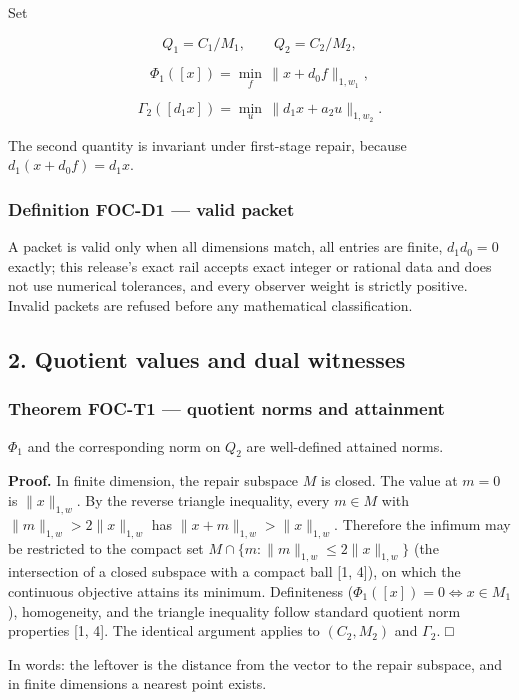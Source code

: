 \documentclass[
  11pt,
]{article}
\begin{document}
Set

\[
Q_1=C_1/M_1,\qquad Q_2=C_2/M_2,
\]

\[
\Phi_1([x])=\min_f\,\|x+d_0 f\|_{1,w_1},
\]

\[
\Gamma_2([d_1 x])=\min_u\,\|d_1 x+a_2 u\|_{1,w_2}.
\]

The second quantity is invariant under first-stage repair, because \(d_1(x+d_0 f)=d_1 x\).

\subsubsection{Definition FOC-D1 --- valid packet}\label{definition-foc-d1-valid-packet}

A packet is valid only when all dimensions match, all entries are finite, \(d_1 d_0=0\) exactly; this release's exact rail accepts exact integer or rational data and does not use numerical tolerances, and every observer weight is strictly positive. Invalid packets are refused before any mathematical classification.

\subsection{2. Quotient values and dual witnesses}\label{quotient-values-and-dual-witnesses}

\subsubsection{Theorem FOC-T1 --- quotient norms and attainment}\label{theorem-foc-t1-quotient-norms-and-attainment}

\(\Phi_1\) and the corresponding norm on \(Q_2\) are well-defined attained norms.

\textbf{Proof.} In finite dimension, the repair subspace \(M\) is closed. The value at \(m=0\) is \(\|x\|_{1,w}\). By the reverse triangle inequality, every \(m\in M\) with \(\|m\|_{1,w}>2\|x\|_{1,w}\) has \(\|x+m\|_{1,w}>\|x\|_{1,w}\). Therefore the infimum may be restricted to the compact set \(M\cap\{m:\|m\|_{1,w}\le 2\|x\|_{1,w}\}\) (the intersection of a closed subspace with a compact ball {[}1, 4{]}), on which the continuous objective attains its minimum. Definiteness (\(\Phi_1([x]) = 0 \iff x \in M_1\)), homogeneity, and the triangle inequality follow standard quotient norm properties {[}1, 4{]}. The identical argument applies to \((C_2, M_2)\) and \(\Gamma_2\). □

In words: the leftover is the distance from the vector to the repair subspace, and in finite dimensions a nearest point exists.
\end{document}

